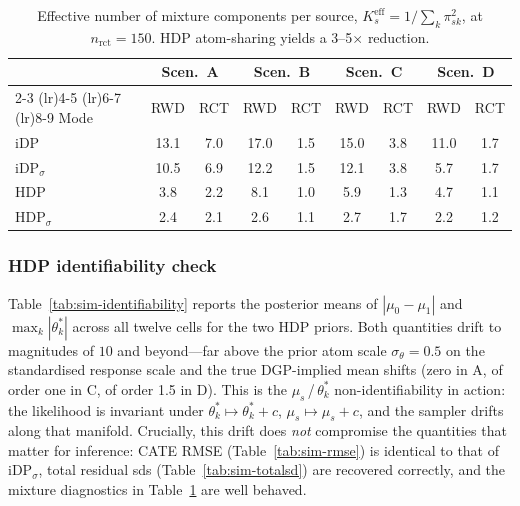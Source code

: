 \documentclass[11pt]{article}
\theoremstyle{plain}
\theoremstyle{definition}
\theoremstyle{remark}
\newcommand{\1}{\mathds{1}}
\newcommand{\miDPs}{\ensuremath{\mathrm{iDP}_\sigma}}
\begin{document}
\begin{table}[tb]
\centering
\small
\caption{Effective number of mixture components per source,
$K^{\text{eff}}_s = 1 / \sum_k \pi_{sk}^2$, at $n_{\text{rct}} = 150$.
HDP atom-sharing yields a 3--5$\times$ reduction.}
\label{tab:sim-keff}
\begin{tabular}{lcccc cccc}
\toprule
& \multicolumn{2}{c}{Scen.\ A} & \multicolumn{2}{c}{Scen.\ B}
& \multicolumn{2}{c}{Scen.\ C} & \multicolumn{2}{c}{Scen.\ D} \\
\cmidrule(lr){2-3} \cmidrule(lr){4-5} \cmidrule(lr){6-7} \cmidrule(lr){8-9}
Mode & RWD & RCT & RWD & RCT & RWD & RCT & RWD & RCT \\
\midrule
iDP          & 13.1 & 7.0 & 17.0 & 1.5 & 15.0 & 3.8 & 11.0 & 1.7 \\
iDP$_\sigma$ & 10.5 & 6.9 & 12.2 & 1.5 & 12.1 & 3.8 &  5.7 & 1.7 \\
HDP          &  3.8 & 2.2 &  8.1 & 1.0 &  5.9 & 1.3 &  4.7 & 1.1 \\
HDP$_\sigma$ &  2.4 & 2.1 &  2.6 & 1.1 &  2.7 & 1.7 &  2.2 & 1.2 \\
\bottomrule
\end{tabular}
\end{table}

\subsubsection*{HDP identifiability check}

Table~\ref{tab:sim-identifiability} reports the posterior means of
$|\mu_0 - \mu_1|$ and $\max_k |\theta_k^*|$ across all twelve cells
for the two HDP priors. Both quantities drift to magnitudes of $10$
and beyond---far above the prior atom scale
$\sigma_\theta = 0.5$ on the standardised response scale and the
true DGP-implied mean shifts (zero in A, of order one in C, of order
1.5 in D). This is the $\mu_s$\,/\,$\theta_k^*$ non-identifiability
in action: the likelihood is invariant under
$\theta_k^* \mapsto \theta_k^* + c$,
$\mu_s \mapsto \mu_s + c$, and the sampler drifts along that
manifold. Crucially, this drift does \emph{not} compromise the
quantities that matter for inference: CATE RMSE (Table~\ref{tab:sim-rmse})
is identical to that of \miDPs, total residual
sds (Table~\ref{tab:sim-totalsd}) are recovered correctly, and the
mixture diagnostics in Table~\ref{tab:sim-keff} are well behaved.
\end{document}
